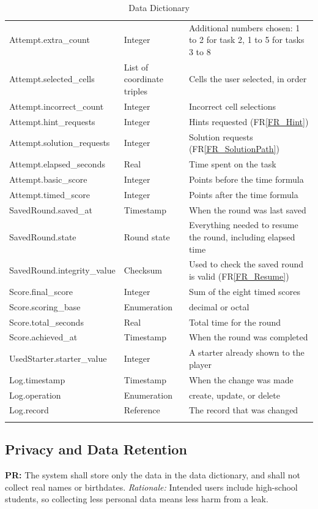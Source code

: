 \documentclass[12pt]{article}
\newcommand{\rref}[1]{FR\ref{#1}}
\newcounter{prnum} %
\begin{document}
{\begin{longtable}{>{\raggedright\arraybackslash}p{} >{\raggedright\arraybackslash}p{} >{\raggedright\arraybackslash}p{}}
Attempt.extra\_count & Integer & Additional numbers chosen: 1 to 2 for task 2, 1 to 5 for tasks 3 to 8\\
Attempt.selected\_cells & List of coordinate triples & Cells the user selected, in order\\
Attempt.incorrect\_count & Integer & Incorrect cell selections\\
Attempt.hint\_requests & Integer & Hints requested (\rref{FR_Hint})\\
Attempt.solution\_requests & Integer & Solution requests (\rref{FR_SolutionPath})\\
Attempt.elapsed\_seconds & Real & Time spent on the task\\
Attempt.basic\_score & Integer & Points before the time formula\\
Attempt.timed\_score & Integer & Points after the time formula\\
SavedRound.saved\_at & Timestamp & When the round was last saved\\
SavedRound.state & Round state & Everything needed to resume the round, including elapsed time\\
SavedRound.integrity\_value & Checksum & Used to check the saved round is valid (\rref{FR_Resume})\\
Score.final\_score & Integer & Sum of the eight timed scores\\
Score.scoring\_base & Enumeration & decimal or octal\\
Score.total\_seconds & Real & Total time for the round\\
Score.achieved\_at & Timestamp & When the round was completed\\
UsedStarter.starter\_value & Integer & A starter already shown to the player\\
Log.timestamp & Timestamp & When the change was made\\
Log.operation & Enumeration & create, update, or delete\\
Log.record & Reference & The record that was changed\\
\bottomrule
\caption{Data Dictionary} \label{tab:DataDictionary}
\end{longtable}
}
 
\subsection{Privacy and Data Retention}
 
\noindent {}\label{PR_1}\textbf{PR\theprnum:} The system shall store only the data in the data dictionary, and shall not collect real names or birthdates. \newline \textit{Rationale:} Intended users include high-school students, so collecting less personal data means less harm from a leak.
 
\end{document}
